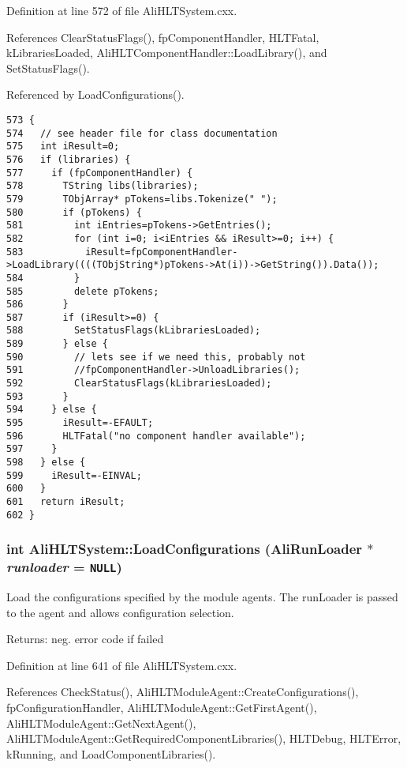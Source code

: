 Definition at line 572 of file Ali\-HLTSystem.cxx.

References Clear\-Status\-Flags(), fp\-Component\-Handler, HLTFatal, k\-Libraries\-Loaded, Ali\-HLTComponent\-Handler::Load\-Library(), and Set\-Status\-Flags().

Referenced by Load\-Configurations().

\footnotesize\begin{verbatim}573 {
574   // see header file for class documentation
575   int iResult=0;
576   if (libraries) {
577     if (fpComponentHandler) {
578       TString libs(libraries);
579       TObjArray* pTokens=libs.Tokenize(" ");
580       if (pTokens) {
581         int iEntries=pTokens->GetEntries();
582         for (int i=0; i<iEntries && iResult>=0; i++) {
583           iResult=fpComponentHandler->LoadLibrary((((TObjString*)pTokens->At(i))->GetString()).Data());
584         }
585         delete pTokens;
586       }
587       if (iResult>=0) {
588         SetStatusFlags(kLibrariesLoaded);
589       } else {
590         // lets see if we need this, probably not
591         //fpComponentHandler->UnloadLibraries();
592         ClearStatusFlags(kLibrariesLoaded);
593       }
594     } else {
595       iResult=-EFAULT;
596       HLTFatal("no component handler available");
597     }
598   } else {
599     iResult=-EINVAL;
600   }
601   return iResult;
602 }
\end{verbatim}\normalsize 


\subsubsection{\setlength{\rightskip}{0pt plus 5cm}int Ali\-HLTSystem::Load\-Configurations (Ali\-Run\-Loader $\ast$ {\em runloader} = {\tt NULL})}\label{classAliHLTSystem_a26}


Load the configurations specified by the module agents. The run\-Loader is passed to the agent and allows configuration selection. \begin{Desc}
\item[Returns:]neg. error code if failed \end{Desc}


Definition at line 641 of file Ali\-HLTSystem.cxx.

References Check\-Status(), Ali\-HLTModule\-Agent::Create\-Configurations(), fp\-Configuration\-Handler, Ali\-HLTModule\-Agent::Get\-First\-Agent(), Ali\-HLTModule\-Agent::Get\-Next\-Agent(), Ali\-HLTModule\-Agent::Get\-Required\-Component\-Libraries(), HLTDebug, HLTError, k\-Running, and Load\-Component\-Libraries().

